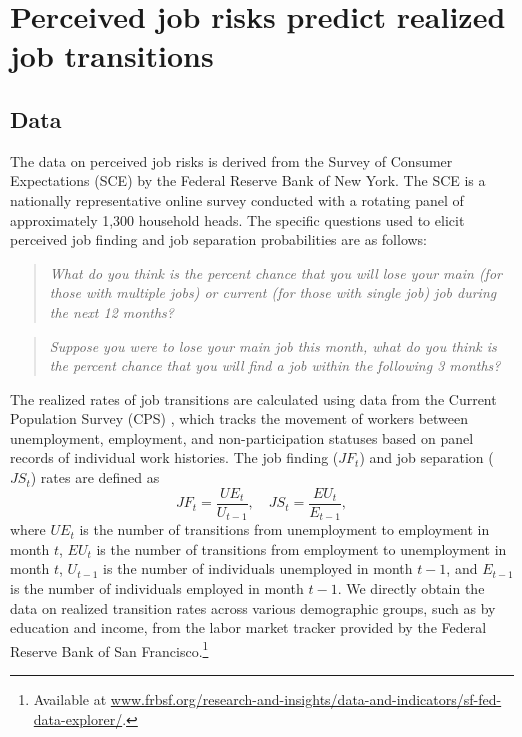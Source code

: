 
\section{Perceived job risks predict realized job transitions} 

\subsection{Data}

The data on perceived job risks is derived from the Survey of Consumer Expectations (SCE) by the Federal Reserve Bank of New York. The SCE is a nationally representative online survey conducted with a rotating panel of approximately 1,300 household heads. The specific questions used to elicit perceived job finding and job separation probabilities are as follows: 
\begin{quote}
    \emph{What do you think is the percent chance that you will lose your main (for those with multiple jobs) or current (for those with single job) job during the next 12 months?}
\end{quote}

\begin{quote}
    \emph{Suppose you were to lose your main job this month, what do you think is the percent chance that you will find a job within the following 3 months?}
\end{quote}

The realized rates of job transitions are calculated using data from the Current Population Survey (CPS) \citep[e.g.,][]{fujita2009cyclicality}, which tracks the movement of workers between unemployment, employment, and non-participation statuses based on panel records of individual work histories. The job finding (${JF}_t$) and job separation (${JS}_t$) rates are defined as
\begin{equation*}
\label{eq:flow_rate_eq} 
JF_t=\frac{UE_t}{U_{t-1}}, \quad JS_t=\frac{EU_t}{E_{t-1}},
\end{equation*}
where $UE_t$ is the number of transitions from unemployment to employment in month $t$, $EU_t$ is the number of transitions from employment to unemployment in month $t$, $U_{t-1}$ is the number of individuals unemployed in month $t-1$, and $E_{t-1}$ is the number of individuals employed in month $t-1$. 
We directly obtain the data on realized transition rates across various demographic groups, such as by education and income, from the labor market tracker provided by the Federal Reserve Bank of San Francisco.\footnote{Available at \url{www.frbsf.org/research-and-insights/data-and-indicators/sf-fed-data-explorer/}.} 


